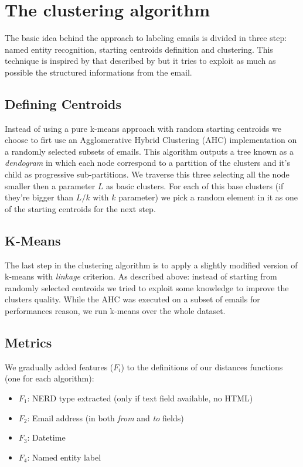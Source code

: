 \documentclass[a4paper,12pt]{report}
\begin{document}
\section{The clustering algorithm}
The basic idea behind the approach to labeling emails is divided in three step: named entity recognition, starting centroids definition and clustering. This technique is inspired by that described by \cite{Manco2008} but it tries to exploit as much as possible the structured informations from the email.



\subsection{Defining Centroids}
Instead of using a pure k-means approach with random starting centroids we choose to firt use an Agglomerative Hybrid Clustering (AHC) implementation on a randomly selected subsets of emails. This algorithm outputs a tree known as a \emph{dendogram} in which each node correspond to a partition of the clusters and it's child as progressive sub-partitions. We traverse this three selecting all the node smaller then a parameter $L$ as basic clusters.
For each of this base clusters (if they're bigger than $L/k$ with $k$ parameter) we pick a random element in it as one of the starting centroids for the next step.

\subsection{K-Means}
The last step in the clustering algorithm is to apply a slightly modified version of k-means with \emph{linkage} criterion. As described above: instead of starting from randomly selected centroids we tried to exploit some knowledge to improve the clusters quality. While the AHC was executed on a subset of emails for performances reason, we run k-means over the whole dataset.

\subsection{Metrics}
We gradually added features ($F_{i}$) to the definitions of our distances functions (one for each algorithm):
\begin{itemize}
\item $F_{1}$: NERD type extracted (only if text field available, no HTML)
\item $F_{2}$: Email address (in both \emph{from} and \emph{to} fields)
\item $F_{3}$: Datetime 
\item $F_{4}$: Named entity label
\end{itemize}
\end{document}
